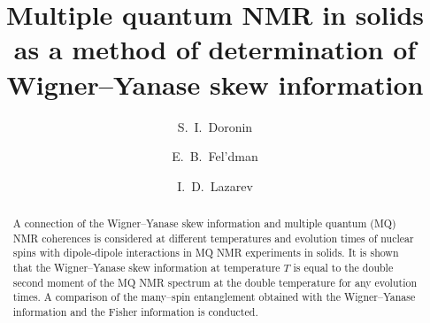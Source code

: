 \documentclass[preprint,12pt]{elsarticle}
\begin{document}
\begin{frontmatter}



\title{Multiple quantum NMR in solids as a method of determination of Wigner--Yanase skew information}





\author[icp]{S.~I.~Doronin}
\author[icp]{E.~B.~Fel'dman}
\author[icp,msu]{I.~D.~Lazarev}
\address[icp]{Institute of Problems of Chemical Physics of Russian Academy of Sciences, \\ Chernogolovka, Moscow Region, Russia 142432}
\address[msu]{Faculty of Fundamental Physical-Chemical Engineering, Lomonosov Moscow State University, GSP-1, Moscow, Russia 119991}

\begin{abstract}
A connection of the Wigner--Yanase skew information and multiple quantum (MQ) NMR coherences is considered at different temperatures and evolution times of nuclear spins with dipole-dipole interactions in MQ NMR experiments in solids.
It is shown that the Wigner--Yanase skew information at temperature $T$ is equal to the double second moment of the MQ NMR spectrum at the double temperature for any evolution times.
A comparison of the many--spin entanglement obtained with the Wigner--Yanase information and the Fisher information is conducted.
\end{abstract}


\end{frontmatter}
\end{document}
